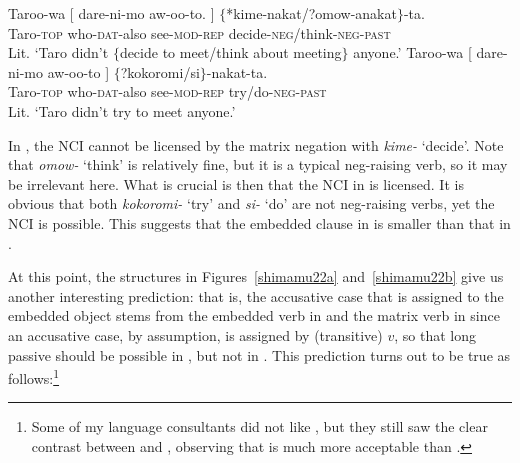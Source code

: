 \documentclass[output=paper]{langsci/langscibook}
\begin{document}
\ea\label{shimamu27}
\begin{xlist} 
\ex\label{shimamu27a}  {\gll Taroo-wa [ dare-ni-mo aw-oo-to. ] $\{$*kime-nakat/?omow-anakat$\}$-ta.\\
Taro-\textsc{top} {} who-\textsc{dat}-also see-\textsc{mod-rep} {} \phantom{$\{$*}decide-\textsc{neg}/think-\textsc{neg}-\textsc{past}\\
\glt Lit. `Taro didn't $\{$decide to meet/think about meeting$\}$ anyone.'}
\ex\label{shimamu27b} \gll Taroo-wa [ dare-ni-mo aw-oo-to ] $\{$?kokoromi/si$\}$-nakat-ta.\\
Taro-\textsc{top} {} who-\textsc{dat}-also see-\textsc{mod-rep} {} try/do-\textsc{neg-past}\\
\glt Lit. `Taro didn't try to meet anyone.'
\end{xlist}
\z
In , the NCI cannot be licensed by the matrix negation with \textit{kime-} `decide'. Note that \textit{omow-} `think' is relatively fine, but it is a typical neg-raising verb, so it may be irrelevant here. What is crucial is then that the NCI in  is licensed. It is obvious that both \textit{kokoromi-} `try' and \textit{si-} `do' are not neg-raising verbs, yet the NCI is possible. This suggests that the embedded clause in  is smaller than that in .

At this point, the structures in Figures~\ref{shimamu22a} and~\ref{shimamu22b} give us another interesting prediction: that is, the accusative case that is assigned to the embedded object stems from the embedded verb in  and the matrix verb in  since an accusative case, by assumption, is assigned by (transitive) $v$, so that long passive should be possible in , but not in . This prediction turns out to be true as follows:\footnote{Some of my language consultants did not like , but they still saw the clear contrast between  and , observing that  is much more acceptable than .}
\end{document}
